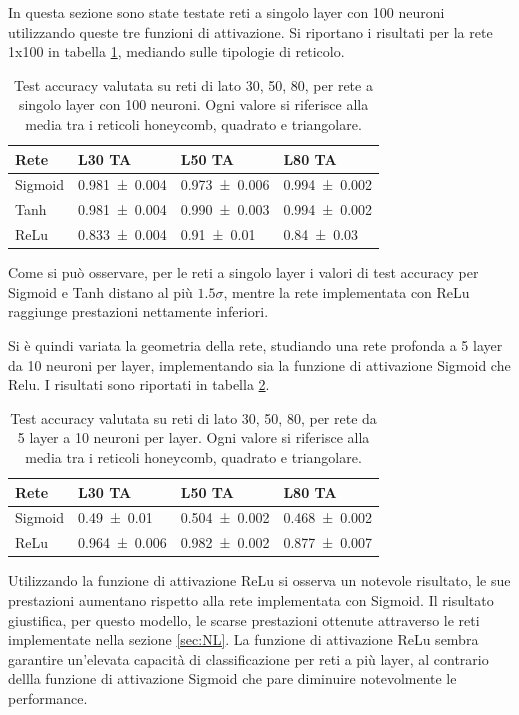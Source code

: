 \documentclass{article}
\begin{document}
In questa sezione sono state testate reti a singolo layer con 100 neuroni utilizzando queste tre funzioni di attivazione.
Si riportano i risultati per la rete 1x100 in tabella \ref{tab:SigVsReluVsTanhS}, mediando sulle tipologie di reticolo.
\begin{table}[!ht]
\begin{center}
\begin{tabular}{llll}
\toprule
Rete & L30 TA & L50 TA & L80 TA \\
\midrule
Sigmoid & \num{0.981\pm 0.004} & \num{0.973\pm 0.006} & \num{0.994\pm 0.002}\\
Tanh & \num{0.981\pm 0.004} & \num{0.990 \pm 0.003} &\num{ 0.994\pm 0.002}\\
ReLu  & \num{0.833\pm 0.004} & \num{0.91 \pm 0.01} &\num{ 0.84\pm 0.03}\\
\bottomrule
\end{tabular}
\end{center}
\caption{Test accuracy valutata su reti di lato 30, 50, 80, per rete a singolo layer con 100 neuroni. Ogni valore si riferisce alla media tra i reticoli honeycomb, quadrato e triangolare.}
\label{tab:SigVsReluVsTanhS}
\end{table}
Come si può osservare, per le reti a singolo layer i valori di test accuracy per Sigmoid e Tanh distano al più $1.5\sigma$, mentre la rete implementata con ReLu raggiunge prestazioni nettamente inferiori.

Si è quindi variata la geometria della rete, studiando una rete profonda a 5 layer da 10 neuroni per layer, implementando sia la funzione di attivazione Sigmoid che Relu.
I risultati sono riportati in tabella \ref{tab:SigVsRelu}.
\begin{table}[!ht]
\begin{center}
\begin{tabular}{llll}
\toprule
Rete & L30 TA & L50 TA & L80 TA \\
\midrule
Sigmoid & \num{0.49\pm 0.01} & \num{0.504\pm 0.002} & \num{0.468\pm 0.002}\\
ReLu  & \num{0.964\pm 0.006} & \num{0.982 \pm 0.002} &\num{ 0.877\pm 0.007}\\
\bottomrule
\end{tabular}
\end{center}
\caption{Test accuracy valutata su reti di lato 30, 50, 80, per rete da 5 layer a 10 neuroni per layer. Ogni valore si riferisce alla media tra i reticoli honeycomb, quadrato e triangolare.}
\label{tab:SigVsRelu}
\end{table}
Utilizzando la funzione di attivazione ReLu si osserva un notevole risultato, le sue prestazioni aumentano rispetto alla rete implementata con Sigmoid.
Il risultato giustifica, per questo modello, le scarse prestazioni ottenute attraverso le reti implementate nella sezione \ref{sec:NL}.
La funzione di attivazione ReLu sembra garantire un'elevata  capacità di classificazione per reti a più layer, al contrario dellla funzione di attivazione Sigmoid che pare diminuire notevolmente le performance.
\end{document}
